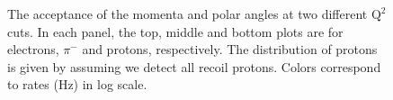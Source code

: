 \begin{figure}[!ht]
 \begin{center}
   \caption[The acceptance of the momenta and scattering angles for electrons, $\pi^{-}$ and protons]{\footnotesize{The acceptance of the momenta and polar angles at two different $\mathrm{Q^{2}}$ cuts. In each panel, the top, middle and bottom plots are for electrons, $\pi^{-}$ and protons, respectively. The distribution of protons is given by assuming we detect all recoil protons. Colors correspond to rates (Hz) in log scale.}}
  \label{p_theta}
  \end{center}
\end{figure}
